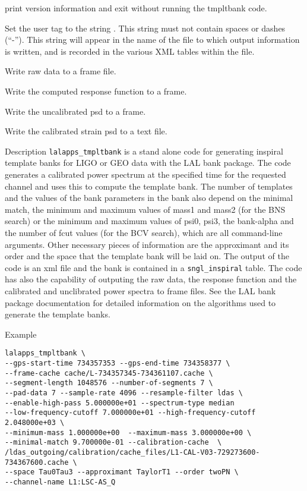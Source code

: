 \begin{entry}
\item[\option{--version}] print version information and exit without running 
the tmpltbank code. 

\item[\option{--user-tag} \parm{usertag}] 
Set the user tag to the string .  
This string must not contain spaces or dashes (``-'').  This string will appear 
in the name of the file to which output information is written, and is recorded 
in the various XML tables within the file.

\item[\option{--write-raw-data}] 
Write raw data to a frame file.

\item[\option{--write-response}] 
Write the computed response function to a frame.

\item[\option{--write-spectrum}] 
Write the uncalibrated psd to a frame.

\item[\option{--write-strain-spectrum}] 
Write the calibrated strain psd to a text file.

 


\item[Description]
\noindent \verb$lalapps_tmpltbank$ is a stand alone code for generating inspiral
template banks for LIGO or GEO data with the LAL bank package.  The code 
generates a calibrated power spectrum at the specified time for the 
requested channel and uses this to compute the template bank.  
The number of templates and the
values of the bank parameters in the bank also depend on the minimal
match, the
minimum and maximum values of mass1 and mass2 (for the BNS search) or the
minimum and maximum values of psi0, psi3, the bank-alpha and the number of
fcut values (for the BCV search), which are all command-line arguments.
Other necessary pieces of information are the approximant and its order and
the space that the template bank will be laid on. The output of the code is
an xml file and the bank is contained in a \verb$sngl_inspiral$ table. The code has
also the capability of outputing the raw data, the response function and the
calibrated and unclibrated power spectra to frame files.
See the LAL bank package
documentation for detailed information on the algorithms used to generate the
template banks.

\item[Example]

\begin{verbatim}
lalapps_tmpltbank \
--gps-start-time 734357353 --gps-end-time 734358377 \
--frame-cache cache/L-734357345-734361107.cache \
--segment-length 1048576 --number-of-segments 7 \
--pad-data 7 --sample-rate 4096 --resample-filter ldas \
--enable-high-pass 5.000000e+01 --spectrum-type median
--low-frequency-cutoff 7.000000e+01 --high-frequency-cutoff 2.048000e+03 \
--minimum-mass 1.000000e+00  --maximum-mass 3.000000e+00 \
--minimal-match 9.700000e-01 --calibration-cache  \
/ldas_outgoing/calibration/cache_files/L1-CAL-V03-729273600-734367600.cache \
--space Tau0Tau3 --approximant TaylorT1 --order twoPN \
--channel-name L1:LSC-AS_Q 


\end{verbatim}
\end{entry}
